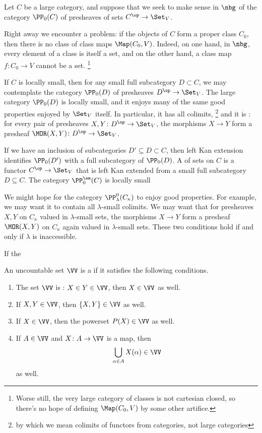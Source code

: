 \begin{eg}%
\label{eg:bigpresheaves}
	Let $ C $ be a large category,
	and suppose that we seek to make sense in $ \nbg $ of the category $ \PP_0(C) $ of presheaves of sets $ C^{\op} \to \Set_V $.
	
	Right away we encounter a problem:
	if the objects of $ C $ form a proper class $ C_ 0 $, then there is no class of class maps $ \Map(C_0, V) $.
	Indeed, on one hand, in $ \nbg $, every element of a class is itself a set,
	and on the other hand, a class map $ f \colon C_0 \to V $ cannot be a set.%
	\footnote{Worse still, the very large category of classes is not cartesian closed,
	so there's no hope of defining $ \Map(C_0, V) $ by some other artifice.}
	
	If $ C $ is locally small, then for any small full subcategory $ D \subset C $,
	we may contemplate the category $ \PP_0(D) $ of presheaves $ D^{\op} \to \Set_V $.
	The large category $ \PP_0(D) $ is locally small,
	and it enjoys many of the same good properties enjoyed by $ \Set_V $ itself.
	In particular, it has all colimits,%
	\footnote{by which we mean colimits of functors from categories, not large categories}
	and it is :
	for every pair of presheaves $ X, Y \colon D^{\op} \to \Set_V $,
	the morphisms $ X \to Y $ form a presheaf $ \MOR(X, Y) \colon D^{\op} \to \Set_V $.

	If we have an inclusion of subcategories $ D' \subseteq D \subset C $, then left Kan extension identifies
	$ \PP_0(D') $ with a full subcategory of $ \PP_0(D) $.
	A  of sets on $ C $ is a functor $ C^{\op} \to \Set_V $
	that is left Kan extended from a small full subcategory $ D \subseteq C $.
	The category $ \PP^{\sm}_0(C) $ is locally small 

	We might hope for the category $ \PP^0_{\lambda}(C_{\kappa}) $ to enjoy good properties.
	For example, we may want it to contain all $ \lambda $-small colimits.
	We may want that for presheaves $ X, Y $ on $ C_{\kappa} $ valued in $ \lambda $-small sets,
	the morphisms $ X \to Y $ form a presheaf $ \MOR(X, Y) $ on $ C_{\kappa} $ again valued in $ \lambda $-small sets.
	These two conditions hold if and only if $ \lambda $ is inaccessible.

	If the 
\end{eg}


\begin{definition}%
\label{dfn:uni}
	An uncountable set $\VV$ is a  if it satisfies the following conditions.
	\begin{enumerate}
		\item The set $\VV$ is : $X\in Y\in\VV$, then $X\in\VV$ as well.
		\item If $X,Y\in\VV$, then $\{X,Y\}\in\VV$ as well.
		\item If $X\in\VV$, then the powerset $P(X)\in\VV$ as well.
		\item If $A\in\VV$ and $X \colon A \to \VV$ is a map, then
		\[
			\bigcup_{\alpha\in A}X(\alpha) \in \VV
		\]
		as well.
	\end{enumerate}
\end{definition}

